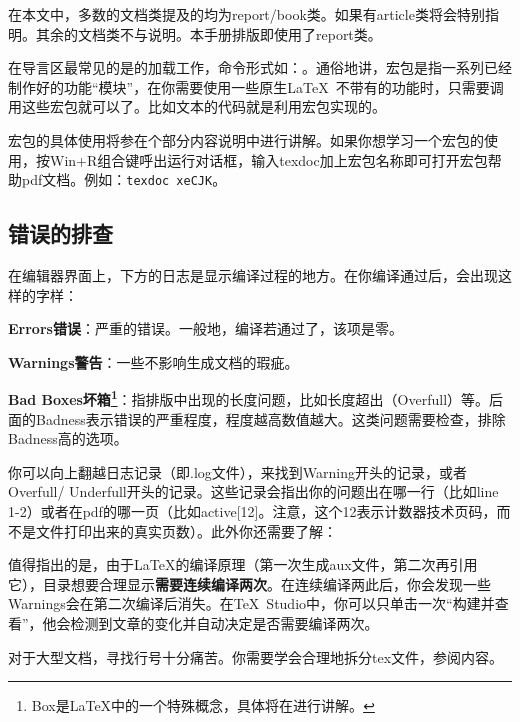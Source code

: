 在本文中，多数的文档类提及的均为report/book类。如果有article类将会特别指明。其余的文档类不与说明。本手册排版即使用了report类。

在导言区最常见的是的加载工作，命令形式如：。通俗地讲，宏包是指一系列已经制作好的功能``模块''，在你需要使用一些原生\LaTeX\ 不带有的功能时，只需要调用这些宏包就可以了。比如文本的代码就是利用宏包实现的。

宏包的具体使用将参在个部分内容说明中进行讲解。如果你想学习一个宏包的使用，按Win+R组合键呼出运行对话框，输入texdoc加上宏包名称即可打开宏包帮助pdf文档。例如：\verb|texdoc xeCJK|。

\subsection{错误的排查}
	\label{subsec:debug}
	在编辑器界面上，下方的日志是显示编译过程的地方。在你编译通过后，会出现这样的字样：
\begin{feai}
	\item {\bfseries{Errors错误}}：严重的错误。一般地，编译若通过了，该项是零。
	\item {\bfseries{Warnings警告}}：一些不影响生成文档的瑕疵。
	\item {\bfseries{Bad Boxes坏箱}\footnote{Box是\LaTeX{}中的一个特殊概念，具体将在进行讲解。}}：指排版中出现的长度问题，比如长度超出（Overfull）等。后面的Badness表示错误的严重程度，程度越高数值越大。这类问题需要检查，排除Badness高的选项。\marginpar{\textcolor{red!70}{此处注解在后续章节，目前未链接}}
\end{feai}

	你可以向上翻越日志记录（即.log文件），来找到Warning开头的记录，或者Overfull/ Underfull开头的记录。这些记录会指出你的问题出在哪一行（比如line 1-2）或者在pdf的哪一页（比如active[12]。注意，这个12表示计数器技术页码，而不是文件打印出来的真实页数）。此外你还需要了解：
\begin{feai}
\item 值得指出的是，由于\LaTeX{}的编译原理（第一次生成aux文件，第二次再引用它），目录想要合理显示{\bfseries{需要连续编译两次}}。在连续编译两此后，你会发现一些Warnings会在第二次编译后消失。在\TeX\ Studio中，你可以只单击一次“构建并查看”，他会检测到文章的变化并自动决定是否需要编译两次。
\item 对于大型文档，寻找行号十分痛苦。你需要学会合理地拆分tex文件，参阅内容。%
\end{feai}

